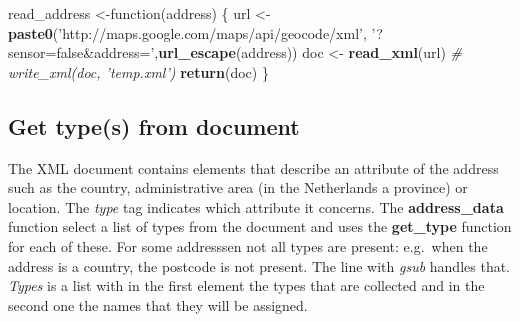 \documentclass[]{article}
\newenvironment{Shaded}{\begin{snugshade}}{\end{snugshade}}
\newcommand{\KeywordTok}[1]{\textcolor[rgb]{0.13,0.29,0.53}{\textbf{{#1}}}}
\newcommand{\DataTypeTok}[1]{\textcolor[rgb]{0.13,0.29,0.53}{{#1}}}
\newcommand{\StringTok}[1]{\textcolor[rgb]{0.31,0.60,0.02}{{#1}}}
\newcommand{\CommentTok}[1]{\textcolor[rgb]{0.56,0.35,0.01}{\textit{{#1}}}}
\newcommand{\NormalTok}[1]{{#1}}
\newcommand{\mytextit}[1]{\textit{#1}}
\newcommand{\mytextbf}[1]{\textbf{#1}}
\begin{document}
\begin{Shaded}
\begin{Highlighting}[]
\NormalTok{read_address <-function(address) \{}
  \NormalTok{url <-}\StringTok{ }\KeywordTok{paste0}\NormalTok{(}\StringTok{'http://maps.google.com/maps/api/geocode/xml'}\NormalTok{,}
                    \StringTok{'?sensor=false&address='}\NormalTok{,}\KeywordTok{url_escape}\NormalTok{(address))}
  \NormalTok{doc <-}\StringTok{ }\KeywordTok{read_xml}\NormalTok{(url)}
  \CommentTok{# write_xml(doc, 'temp.xml')}
  \KeywordTok{return}\NormalTok{(doc)}
\NormalTok{\}}
\end{Highlighting}
\end{Shaded}

\subsection{Get type(s) from document}\label{get-types-from-document}

The XML document contains elements that describe an attribute of the
address such as the country, administrative area (in the Netherlands a
province) or location. The \mytextit{type} tag indicates which attribute
it concerns. The \mytextbf{address\_data} function select a list of
types from the document and uses the \mytextbf{get\_type} function for
each of these. For some addresssen not all types are present: e.g.~when
the address is a country, the postcode is not present. The line with
\mytextit{gsub} handles that. \mytextit{Types} is a list with in the
first element the types that are collected and in the second one the
names that they will be assigned.

\begin{Shaded}
\end{Shaded}
\end{document}
